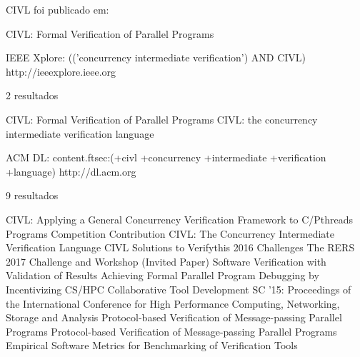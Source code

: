 CIVL foi publicado em:

CIVL: Formal Verification of Parallel Programs

IEEE Xplore: (('concurrency intermediate verification') AND CIVL)
http://ieeexplore.ieee.org

2 resultados

CIVL: Formal Verification of Parallel Programs
CIVL: the concurrency intermediate verification language

ACM DL: content.ftsec:(+civl +concurrency +intermediate +verification +language)
http://dl.acm.org

9 resultados

CIVL: Applying a General Concurrency Verification Framework to C/Pthreads Programs Competition Contribution
CIVL: The Concurrency Intermediate Verification Language
CIVL Solutions to Verifythis 2016 Challenges
The RERS 2017 Challenge and Workshop (Invited Paper)
Software Verification with Validation of Results
Achieving Formal Parallel Program Debugging by Incentivizing CS/HPC Collaborative Tool Development
SC '15: Proceedings of the International Conference for High Performance Computing, Networking, Storage and Analysis
Protocol-based Verification of Message-passing Parallel Programs
Protocol-based Verification of Message-passing Parallel Programs
Empirical Software Metrics for Benchmarking of Verification Tools
